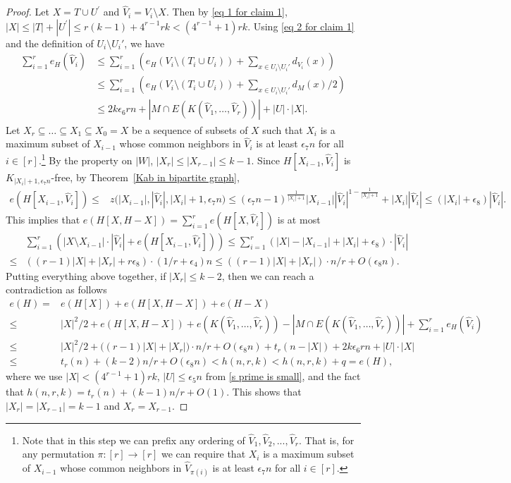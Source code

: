 \documentclass[10pt]{article}
\begin{document}
\begin{proof}
Let $X=T\cup U^\prime$ and $\widehat{V}_i=V_i\setminus X$.
Then by \eqref{eq 1 for claim 1}, $|X|\leq |T|+|U^\prime|\leq r(k-1)+ 4^{r-1}rk< (4^{r-1}+1)rk$.
Using \eqref{eq 2 for claim 1} and the definition of $U_i\setminus U_i'$, we have
\begin{align*}\label{equ:sum-Vi-wide}
\sum_{i=1}^{r}e_H(\widehat{V}_i)&\leq \sum_{i=1}^{r}\left(e_H(V_i\setminus (T_i\cup U_i))+\sum_{x\in U_i\setminus U_i'}d_{V_i}(x)\right)\\
&\leq \sum_{i=1}^{r}\left(e_H(V_i\setminus (T_i\cup U_i))+\sum_{x\in U_i\setminus U_i'} d_M(x)/2\right)\\
&\leq 2k \epsilon_6 rn+|M\cap E(K(\widehat{V}_1,\ldots,\widehat{V}_r))|+|U|\cdot |X|.
\end{align*}
Let $X_r\subseteq \ldots \subseteq  X_1\subseteq X_0=X$ be a sequence of subsets of $X$ such that
$X_i$ is a maximum subset of $X_{i-1}$ whose common neighbors in $\widehat{V}_i$ is at least $\epsilon_7n$ for all $i\in [r]$.\footnote{Note that in this step we can prefix any ordering of $\widehat{V}_1, \widehat{V}_2,...,\widehat{V}_r$. That is, for any permutation $\pi: [r]\to [r]$ we can require that $X_i$ is a maximum subset of $X_{i-1}$ whose common neighbors in $\widehat{V}_{\pi(i)}$ is at least $\epsilon_7n$ for all $i\in [r]$.}
By the property on $|W|$, $|X_r|\leq |X_{r-1}| \leq k-1$.
Since $H[X_{i-1},\widehat{V}_i]$ is $K_{|X_i|+1,\epsilon_7 n }$-free, by Theorem~\ref{Kab in bipartite graph},
\begin{align*}
e(H[X_{i-1},\widehat{V}_i])\leq &z\big(|X_{i-1}|,|\widehat{V}_i|,|X_i|+1, \epsilon_7 n\big)
\leq \left(\epsilon_7 n-1\right)^{\frac{1}{|X_i|+1}}|X_{i-1}||\widehat{V}_i|^{1-\frac{1}{|X_i|+1}}+|X_i| |\widehat{V}_i|
\leq (|X_i|+\epsilon_8)|\widehat{V}_i| .
\end{align*}
This implies that $e(H[X,H-X])= \sum^r_{i=1}e(H[X,\widehat{V}_i])$ is at most
\begin{align*}
& \sum^r_{i=1} \left(|X\setminus X_{i-1}|\cdot |\widehat{V}_i|+e(H[X_{i-1},\widehat{V}_i])\right) \leq \sum^r_{i=1}(|X|-|X_{i-1}|+|X_i|+\epsilon_8)\cdot |\widehat{V}_i|\\
\leq & ((r-1)|X|+|X_r|+r\epsilon_8)\cdot(1/r+\epsilon_4)n\leq ((r-1)|X|+|X_r|)\cdot n/r+O(\epsilon_8n).
\end{align*}
Putting everything above together, if $|X_{r}|\leq k-2$, then we can reach a contradiction as follows
\begin{align*}
 e(H)= & e(H[X])+e(H[X,H-X])+e(H-X)\\
\leq & |X|^2/2+e(H[X,H-X])+ e(K(\widehat{V}_1,\ldots,\widehat{V}_r))-|M\cap E(K(\widehat{V}_1,\ldots,\widehat{V}_r))|+\sum_{i=1}^{r}e_H(\widehat{V}_i)\\
\leq & |X|^2/2+\big((r-1)|X|+|X_r|\big)\cdot n/r+O(\epsilon_8n)+t_r(n-|X|)+2k\epsilon_6 rn+|U|\cdot |X|\\
\leq & t_r(n)+(k-2)n/r+O(\epsilon_8 n)<h(n,r,k)< h(n,r,k)+q=e(H),
\end{align*}
where we use $|X|<(4^{r-1}+1)rk$, $|U|\leq \epsilon_5n$ from \eqref{s prime is small}, and the fact that $h(n,r,k)=t_r(n)+(k-1)n/r+O(1)$.
This shows that $|X_{r}|=|X_{r-1}|=k-1$ and $X_r=X_{r-1}$.


\end{proof}
\end{document}
